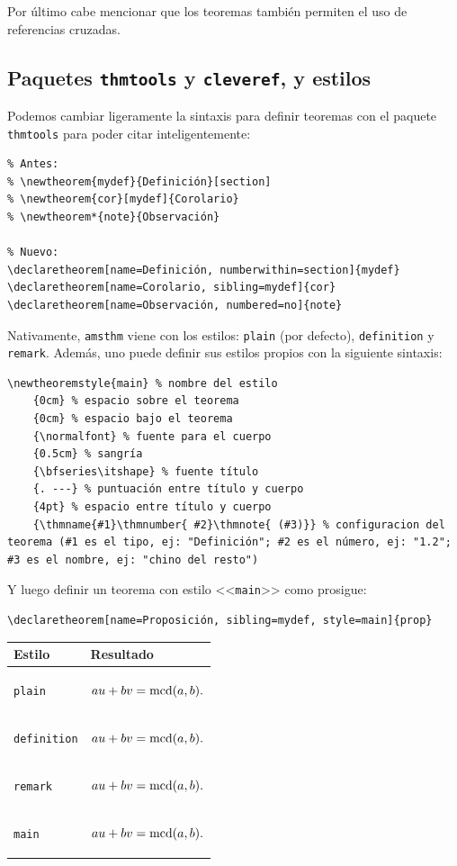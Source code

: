 \documentclass[intro-breve-latex.tex]{subfiles}
\begin{document}
Por último cabe mencionar que los teoremas también permiten el uso de referencias cruzadas.

\subsection*{Paquetes \texttt{thmtools} y \texttt{cleveref}, y estilos}
Podemos cambiar ligeramente la sintaxis para definir teoremas con el paquete \texttt{thmtools} para poder citar inteligentemente:
\begin{lstlisting}
% Antes:
% \newtheorem{mydef}{Definición}[section]
% \newtheorem{cor}[mydef]{Corolario}
% \newtheorem*{note}{Observación}

% Nuevo:
\declaretheorem[name=Definición, numberwithin=section]{mydef}
\declaretheorem[name=Corolario, sibling=mydef]{cor}
\declaretheorem[name=Observación, numbered=no]{note}
\end{lstlisting}

Nativamente, \texttt{amsthm} viene con los estilos: \texttt{plain} (por defecto), \texttt{definition} y \texttt{remark}.
Además, uno puede definir sus estilos propios con la siguiente sintaxis:
\begin{lstlisting}
\newtheoremstyle{main} % nombre del estilo
	{0cm} % espacio sobre el teorema
	{0cm} % espacio bajo el teorema
	{\normalfont} % fuente para el cuerpo
	{0.5cm} % sangría
	{\bfseries\itshape} % fuente título
	{. ---} % puntuación entre título y cuerpo
	{4pt} % espacio entre título y cuerpo
	{\thmname{#1}\thmnumber{ #2}\thmnote{ (#3)}} % configuracion del teorema (#1 es el tipo, ej: "Definición"; #2 es el número, ej: "1.2"; #3 es el nombre, ej: "chino del resto")
\end{lstlisting}
Y luego definir un teorema con estilo <<\texttt{main}>> como prosigue:
\begin{lstlisting}
\declaretheorem[name=Proposición, sibling=mydef, style=main]{prop}
\end{lstlisting}
\begin{center}
	\begin{tabular}{l|p{10cm}}
		\textbf{Estilo} & \textbf{Resultado} \\
		\hline
		\texttt{plain} & \begin{propp}[Bézout] $au + bv = \operatorname{mcd}(a, b).$ \end{propp} \\
		\texttt{definition} & \begin{propd}[Bézout] $au + bv = \operatorname{mcd}(a, b).$ \end{propd} \\
		\texttt{remark} & \begin{propr}[Bézout] $au + bv = \operatorname{mcd}(a, b).$ \end{propr} \\
		\texttt{main} & \begin{prop}[Bézout] $au + bv = \operatorname{mcd}(a, b).$ \end{prop} \\
	\end{tabular}
\end{center}
\end{document}
